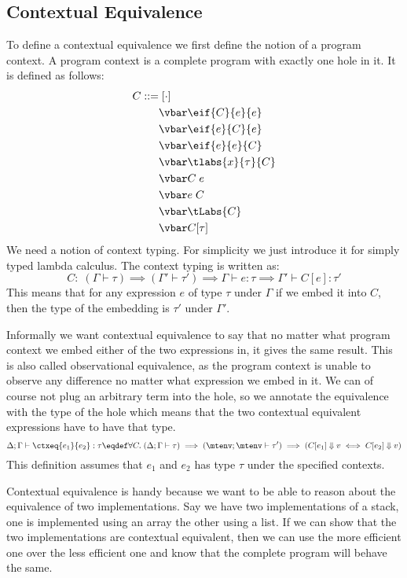 \subsection*{Contextual Equivalence}
To define a contextual equivalence we first define the notion of a program context. A program context is a complete program with exactly one hole in it. It is defined as follows:
\begin{align*}
  C ::= &\;  [\cdot] \\
        &\vbar \eif{C}{e}{e}  \\
        &\vbar \eif{e}{C}{e} \\
        &\vbar \eif{e}{e}{C} \\
        &\vbar \tlabs{x}{\tau}{C} \\
        &\vbar C \; e \\
        &\vbar e \; C \\
        &\vbar \tLabs{C} \\
        &\vbar C[\tau]
\end{align*}
We need a notion of context typing. For simplicity we just introduce it for simply typed lambda calculus. The context typing is written as:
\[%
C:\; (\Gamma \vdash \tau) \implies (\Gamma' \vdash \tau') \implies \Gamma \vdash e : \tau \implies \Gamma' \vdash C[e] : \tau'
\]
This means that for any expression $e$ of type $\tau$ under $\Gamma$ if we embed it into $C$, then the type of the embedding is $\tau'$ under $\Gamma'$.

Informally we want contextual equivalence to say that no matter what program context we embed either of the two expressions in, it gives the same result. This is also called observational equivalence, as the program context is unable to observe any difference no matter what expression we embed in it. We can of course not plug an arbitrary term into the hole, so we annotate the equivalence with the type of the hole which means that the two contextual equivalent expressions have to have that type.
\[
  \Delta; \Gamma \vdash \ctxeq{e_1}{e_2} : \tau \eqdef \forall C.\; (\Delta ; \Gamma \vdash \tau ) \implies (\mtenv ; \mtenv \vdash \tau') \implies (C[e_1] \Downarrow v \iff C[e_2] \Downarrow v)
\]
This definition assumes that $e_1$ and $e_2$ has type $\tau$ under the specified contexts.

Contextual equivalence is handy because we want to be able to reason
about the equivalence of two implementations. Say we have two
implementations of a stack, one is implemented using an array the
other using a list. If we can show that the two implementations are
contextual equivalent, then we can use the more efficient one over the
less efficient one and know that the complete program will behave the
same. %


